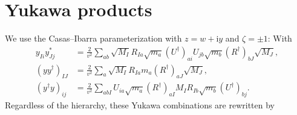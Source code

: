 \documentclass[a4paper,11pt,captions=tableheading,DIV=12]{scrartcl}
\numberwithin{equation}{section}
\newcommand\ii{\mathrm{i}}
\begin{document}
\appendix
\section{Yukawa products}
We use the Casas--Ibarra parameterization with $z=w+\ii y$ and $\zeta=\pm1$:
With 
\begin{align}
 y_{Ii}y^*_{Jj} &= \frac{2}{v^2}\sum_{ab}
\sqrt{M_I}R_{Ia}\sqrt{m_a}(U^\dagger)_{ai}
U_{jb}\sqrt{m_b}(R^\dagger)_{bJ}\sqrt{M_J},
\\
 (yy^\dagger)_{IJ} &= \frac{2}{v^2}\sum_{a}
\sqrt{M_I}R_{Ia}{m_a}(R^\dagger)_{aJ}\sqrt{M_J},\\
 (y^\dagger y)_{ij} &= \frac{2}{v^2}\sum_{abI}
U_{ia}\sqrt{m_a}(R^\dagger)_{aI}
M_I R_{Ib}\sqrt{m_b}(U^\dagger)_{bj}.
\end{align}
Regardless of the hierarchy, these Yukawa combinations are rewritten by
\end{document}
